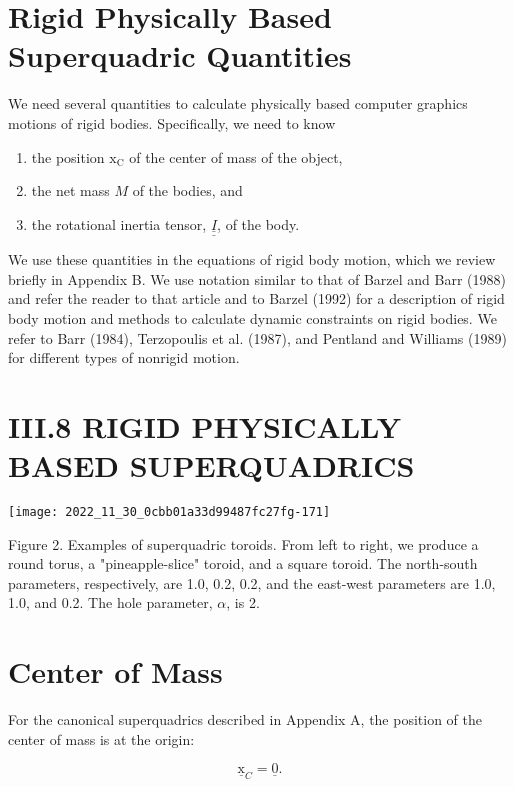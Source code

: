 \section{Rigid Physically Based Superquadric Quantities}
We need several quantities to calculate physically based computer graphics motions of rigid bodies. Specifically, we need to know

\begin{enumerate}
  \item the position $\mathrm{x}_{\mathrm{C}}$ of the center of mass of the object,

  \item the net mass $M$ of the bodies, and

  \item the rotational inertia tensor, $\underline{\underline{I}}$, of the body.

\end{enumerate}

We use these quantities in the equations of rigid body motion, which we review briefly in Appendix B. We use notation similar to that of Barzel and Barr (1988) and refer the reader to that article and to Barzel (1992) for a description of rigid body motion and methods to calculate dynamic constraints on rigid bodies. We refer to Barr (1984), Terzopoulis et al. (1987), and Pentland and Williams (1989) for different types of nonrigid motion.

\section{III.8 RIGID PHYSICALLY BASED SUPERQUADRICS}
\begin{center}
\texttt{[image: 2022\_11\_30\_0cbb01a33d99487fc27fg-171]}
\end{center}

Figure 2. Examples of superquadric toroids. From left to right, we produce a round torus, a "pineapple-slice" toroid, and a square toroid. The north-south parameters, respectively, are 1.0, 0.2, 0.2, and the east-west parameters are 1.0, 1.0, and 0.2. The hole parameter, $\alpha$, is 2.

\section{Center of Mass}
For the canonical superquadrics described in Appendix A, the position of the center of mass is at the origin:

$$
\underline{\mathrm{x}}_{C}=\underline{0} .
$$

